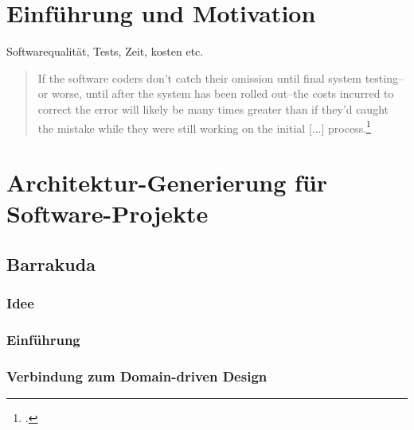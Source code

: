 \documentclass[12pt,a4paper,bibliography=totocnumbered,listof=totocnumbered]{scrartcl}
\begin{document}
\onehalfspacing
\renewcommand{\thesection}{\arabic{section}}
\renewcommand{\theHsection}{\arabic{section}}
\setcounter{section}{0}
\setcounter{page}{1}

\section{Einführung und Motivation}

Softwarequalität, Tests, Zeit, kosten etc. 

\begin{quote}
	\begin{itshape}
	If the software coders don't catch their omission until final system testing--or worse, until after the system has been rolled out--the costs incurred to correct the error will likely be many times greater than if they'd caught the mistake while they were still working on the initial [...] process.\footcite{charette}
	\end{itshape}
\end{quote}

\section{Architektur-Generierung für Software-Projekte}

\subsection{Barrakuda}

\subsubsection{Idee}

\subsubsection{Einführung}

\subsubsection{Verbindung zum Domain-driven Design}
\end{document}
